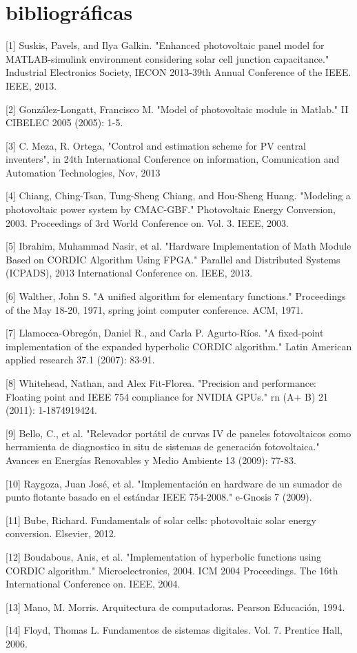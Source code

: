 \chapter{bibliográficas}

[1] Suskis, Pavels, and Ilya Galkin. "Enhanced photovoltaic panel model for MATLAB-simulink environment considering solar cell junction capacitance." Industrial Electronics Society, IECON 2013-39th Annual Conference of the IEEE. IEEE, 2013.

[2] González-Longatt, Francisco M. "Model of photovoltaic module in Matlab." II CIBELEC 2005 (2005): 1-5.

[3] C. Meza, R. Ortega, "Control and estimation scheme for PV central inventers", in 24th International Conference on information, Comunication and Automation Technologies, Nov, 2013 

[4] Chiang, Ching-Tsan, Tung-Sheng Chiang, and Hou-Sheng Huang. "Modeling a photovoltaic power system by CMAC-GBF." Photovoltaic Energy Conversion, 2003. Proceedings of 3rd World Conference on. Vol. 3. IEEE, 2003.

[5] Ibrahim, Muhammad Nasir, et al. "Hardware Implementation of Math Module Based on CORDIC Algorithm Using FPGA." Parallel and Distributed Systems (ICPADS), 2013 International Conference on. IEEE, 2013.

[6] Walther, John S. "A unified algorithm for elementary functions." Proceedings of the May 18-20, 1971, spring joint computer conference. ACM, 1971.

[7] Llamocca-Obregón, Daniel R., and Carla P. Agurto-Ríos. "A fixed-point implementation of the expanded hyperbolic CORDIC algorithm." Latin American applied research 37.1 (2007): 83-91.

[8] Whitehead, Nathan, and Alex Fit-Florea. "Precision and performance: Floating point and IEEE 754 compliance for NVIDIA GPUs." rn (A+ B) 21 (2011): 1-1874919424.

[9] Bello, C., et al. "Relevador portátil de curvas IV de paneles fotovoltaicos como herramienta de diagnostico in situ de sistemas de generación fotovoltaica." Avances en Energías Renovables y Medio Ambiente 13 (2009): 77-83.

[10] Raygoza, Juan José, et al. "Implementación en hardware de un sumador de punto flotante basado en el estándar IEEE 754-2008." e-Gnosis 7 (2009).

[11] Bube, Richard. Fundamentals of solar cells: photovoltaic solar energy conversion. Elsevier, 2012.

[12] Boudabous, Anis, et al. "Implementation of hyperbolic functions using CORDIC algorithm." Microelectronics, 2004. ICM 2004 Proceedings. The 16th International Conference on. IEEE, 2004.

[13] Mano, M. Morris. Arquitectura de computadoras. Pearson Educación, 1994.

[14] Floyd, Thomas L. Fundamentos de sistemas digitales. Vol. 7. Prentice Hall, 2006.